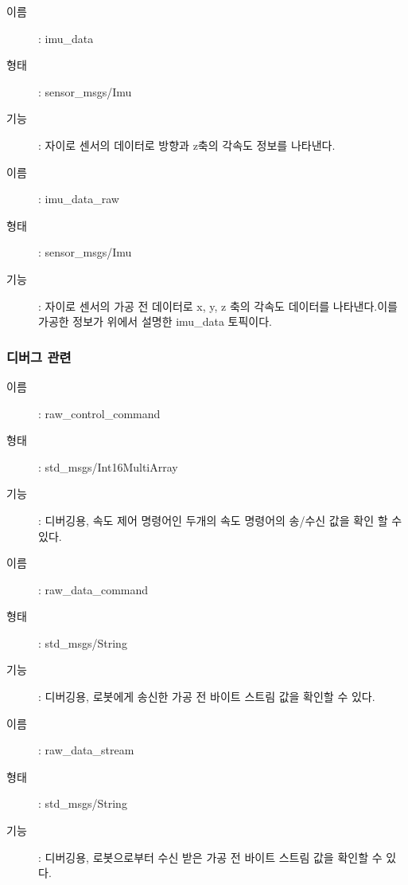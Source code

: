 \vspace{\baselineskip}
\begin{description}
\item[이름]: imu\_data
\item[형태]: sensor\_msgs/Imu
\item[기능]: 자이로 센서의 데이터로 방향과 z축의 각속도 정보를 나타낸다.
\end{description}

\vspace{\baselineskip}
\begin{description}
\item[이름]: imu\_data\_raw
\item[형태]: sensor\_msgs/Imu
\item[기능]: 자이로 센서의 가공 전 데이터로 x, y, z 축의 각속도 데이터를 나타낸다.이를 가공한 정보가 위에서 설명한 imu\_data 토픽이다.
\end{description}

\subsubsection{디버그 관련}

\vspace{\baselineskip}
\begin{description}
\item[이름]: raw\_control\_command
\item[형태]: std\_msgs/Int16MultiArray
\item[기능]: 디버깅용, 속도 제어 명령어인 두개의 속도 명령어의 송/수신 값을 확인 할 수 있다.
\end{description}

\vspace{\baselineskip}
\begin{description}
\item[이름]: raw\_data\_command
\item[형태]: std\_msgs/String
\item[기능]: 디버깅용, 로봇에게 송신한 가공 전 바이트 스트림 값을 확인할 수 있다.
\end{description}

\vspace{\baselineskip}
\begin{description}
\item[이름]: raw\_data\_stream
\item[형태]: std\_msgs/String
\item[기능]: 디버깅용, 로봇으로부터 수신 받은 가공 전 바이트 스트림 값을 확인할 수 있다.
\end{description}

